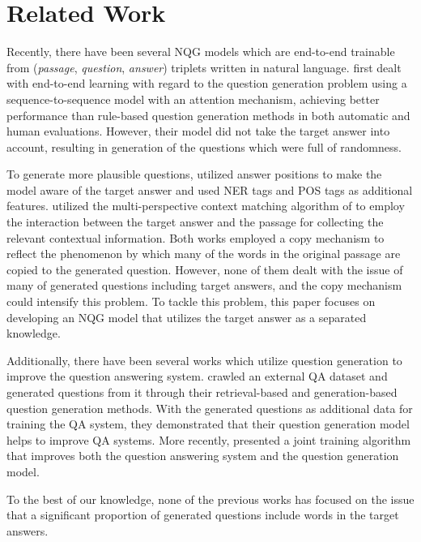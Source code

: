 \documentclass[letterpaper]{article} %
\begin{document}
\section{Related Work}
Recently, there have been several NQG models which are end-to-end trainable from (\textit{passage}, \textit{question}, \textit{answer}) triplets written in natural language.
\cite{du2017learning} first dealt with end-to-end learning with regard to the question generation problem using a sequence-to-sequence model with an attention mechanism, achieving better performance than rule-based question generation methods in both automatic and human evaluations.
However, their model did not take the target answer into account, resulting in generation of the questions which were full of randomness.

To generate more plausible questions, \cite{zhou2017neural} utilized answer positions to make the model aware of the target answer and used NER tags and POS tags as additional features.
\cite{song2018leveraging} utilized the multi-perspective context matching algorithm of \cite{wang2017bilateral} to employ the interaction between the target answer and the passage for collecting the relevant contextual information.
Both works employed a copy mechanism \cite{gulcehre2016pointing} to reflect the phenomenon by which many of the words in the original passage are copied to the generated question.
However, none of them dealt with the issue of many of generated questions including target answers, and the copy mechanism could intensify this problem.
To tackle this problem, this paper focuses on developing an NQG model that utilizes the target answer as a separated knowledge.

Additionally, there have been several works which utilize question generation to improve the question answering system.
\cite{duan2017question} crawled an external QA dataset and generated questions from it through their retrieval-based and generation-based question generation methods. With the generated questions as additional data for training the QA system, they demonstrated that their question generation model helps to improve QA systems.
More recently,\cite{tang2018learning} presented a joint training algorithm that improves both the question answering system and the question generation model.

To the best of our knowledge, none of the previous works has focused on the issue that a significant proportion of generated questions include words in the target answers.
\end{document}
